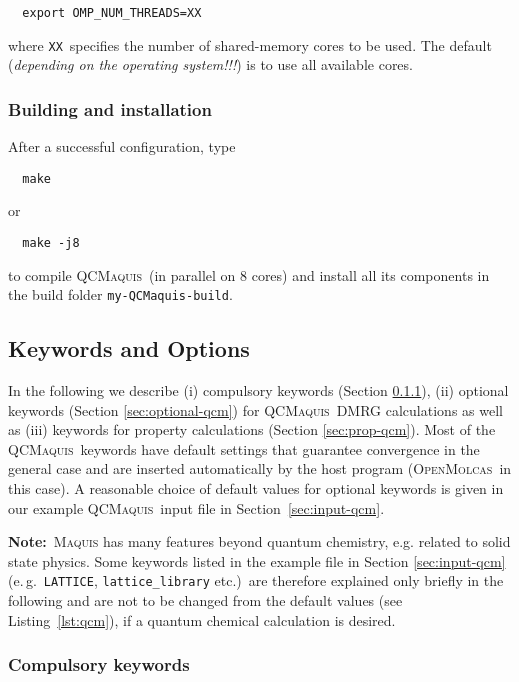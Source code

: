 \documentclass[bibliography=totoc,12pt,a4paper]{scrartcl}
\newcommand{\mol}{\textsc{OpenMolcas}}
\newcommand{\qcm}{\textsc{QCMaquis}}
\newcommand{\hostp}{\mol}
\newcommand{\qcmbuild}{\texttt{my-QCMaquis-build}}
\newcommand{\kwd}[1]{\texttt{#1}}
\begin{document}
\begin{verbatim}
  export OMP_NUM_THREADS=XX
\end{verbatim}
%
where \texttt{XX}\ specifies the number of shared-memory cores to be used.
The default (\emph{depending on the operating system!!!}) is to use all available cores.

\subsubsection{Building and installation}
\label{subsubsec:build-stand}

After a successful configuration, type
\begin{verbatim}
  make
\end{verbatim}
%
or

\begin{verbatim}
  make -j8
\end{verbatim}
%
to compile \qcm\ (in parallel on 8 cores) and install all its components in the build folder \texttt{\qcmbuild}.

\subsection{Keywords and Options}\label{sec:qcmaquis-kw}

In the following we describe (i) compulsory keywords (Section \ref{sec:compul-qcm}), (ii) optional keywords (Section \ref{sec:optional-qcm}) for \qcm\ DMRG calculations as well as (iii) keywords for property calculations (Section \ref{sec:prop-qcm}).
Most of the \qcm\ keywords have default settings that guarantee convergence in the general case and are inserted automatically
by the host program (\hostp\ in this case). 
A reasonable choice of default values for optional keywords is given in our
example \qcm\ input file in Section~\ref{sec:input-qcm}.

\begin{framed}
  \noindent\textbf{Note:}\ \textsc{Maquis} has many features beyond quantum chemistry, e.g. related to solid state physics.
  Some keywords listed in the example file in Section \ref{sec:input-qcm} (e.\,g.\ \kwd{LATTICE}, \kwd{lattice\_library} etc.)\ are therefore explained only briefly in the following and are not to be changed from the default values (see Listing~\ref{lst:qcm}), if a quantum chemical calculation is desired.
\end{framed}

\subsubsection{Compulsory keywords}
\label{sec:compul-qcm}
\end{document}
